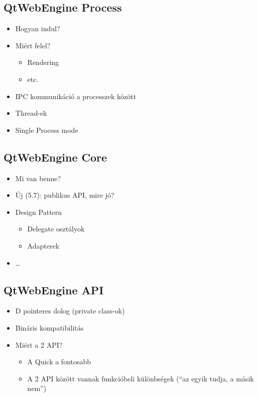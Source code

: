 \documentclass[12pt]{report}
\begin{document}
\subsection{QtWebEngine Process}
\begin{itemize}
    \item Hogyan indul?
    \item Miért felel?
        \begin{itemize}
            \item Rendering
            \item etc.
        \end{itemize}
    \item IPC kommunikáció a processzek között
    \item Thread-ek
    \item Single Process mode
\end{itemize}

\subsection{QtWebEngine Core}
\begin{itemize}
    \item Mi van benne?
    \item Új (5.7): publikus API, mire jó?
    \item Design Pattern
        \begin{itemize}
            \item Delegate osztályok
            \item Adapterek
        \end{itemize}
    \item \dots
\end{itemize}

\subsection{QtWebEngine API}
\begin{itemize}
    \item D pointeres dolog (private class-ok)
    \item Bináris kompatibilitás
    \item Miért a 2 API?
    \begin{itemize}
        \item A Quick a fontosabb
        \item A 2 API között vannak funkcióbeli különbségek (``az egyik tudja, a másik nem'')
    \end{itemize}
\end{itemize}
\end{document}
